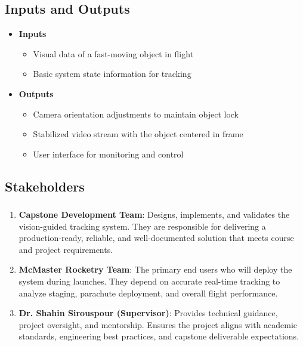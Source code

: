 \documentclass{article}
\begin{document}
\subsection{Inputs and Outputs}
\begin{itemize}
    \item \textbf{Inputs}
    \begin{itemize}
        \item Visual data of a fast-moving object in flight
        \item Basic system state information for tracking
    \end{itemize}

    \item \textbf{Outputs}
    \begin{itemize}
        \item Camera orientation adjustments to maintain object lock
        \item Stabilized video stream with the object centered in frame
        \item User interface for monitoring and control
    \end{itemize}
\end{itemize}


\subsection{Stakeholders}

\subsubsection*{\color{blue}{Direct Stakeholders}}
\begin{enumerate}
    \item \textbf{Capstone Development Team}: Designs, implements, and validates the vision-guided tracking system. They are responsible for delivering a production-ready, reliable, and well-documented solution that meets course and project requirements.  

    \item \textbf{McMaster Rocketry Team}: The primary end users who will deploy the system during launches. They depend on accurate real-time tracking to analyze staging, parachute deployment, and overall flight performance.  

    \item \textbf{Dr. Shahin Sirouspour (Supervisor)}: Provides technical guidance, project oversight, and mentorship. Ensures the project aligns with academic standards, engineering best practices, and capstone deliverable expectations.  
\end{enumerate}
\end{document}

